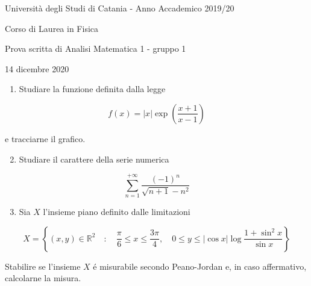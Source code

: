 \documentclass[10pt]{article}
\begin{document}
Università degli Studi di Catania - Anno Accademico 2019/20

Corso di Laurea in Fisica

Prova scritta di Analisi Matematica 1 - gruppo 1

14 dicembre 2020

\begin{enumerate}
  \item Studiare la funzione definita dalla legge
\end{enumerate}

\[
f(x)=|x| \exp \left(\frac{x+1}{x-1}\right)
\]

e tracciarne il grafico.

\begin{enumerate}
  \setcounter{enumi}{1}
  \item Studiare il carattere della serie numerica
\end{enumerate}

\[
\sum_{n=1}^{+\infty} \frac{(-1)^{n}}{\sqrt{n+1}-n^{2}}
\]

\begin{enumerate}
  \setcounter{enumi}{2}
  \item Sia \(X\) l'insieme piano definito dalle limitazioni
\end{enumerate}

\[
X=\left\{(x, y) \in \mathbb{R}^{2} \quad: \quad \frac{\pi}{6} \leq x \leq \frac{3 \pi}{4}, \quad 0 \leq y \leq|\cos x| \log \frac{1+\sin ^{2} x}{\sin x}\right\}
\]

Stabilire se l'insieme \(X\) é misurabile secondo Peano-Jordan e, in caso affermativo, calcolarne la misura.
\end{document}
